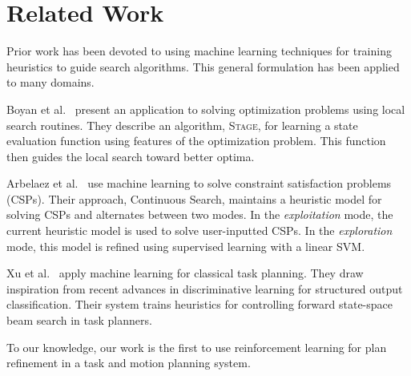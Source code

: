 \section{Related Work}
Prior work has been devoted to using machine learning techniques for
training heuristics to guide search algorithms. This general formulation
has been applied to many domains.

Boyan et al.~\cite{Boyanlearning} present an application to solving optimization
problems using local search routines. They describe an algorithm, \textsc{Stage},
for learning a state evaluation function using features of the optimization problem.
This function then guides the local search toward better optima.

Arbelaez et al.~\cite{hamadisearch} use machine learning to solve constraint
satisfaction problems (CSPs). Their approach, Continuous Search, maintains a heuristic
model for solving CSPs and alternates between two modes. In the \emph{exploitation} mode,
the current heuristic model is used to solve user-inputted CSPs. In the \emph{exploration}
mode, this model is refined using supervised learning with a linear SVM.

Xu et al.~\cite{Xu07discriminativelearning} apply machine learning for classical task
planning. They draw inspiration from recent advances in discriminative learning for
structured output classification. Their system trains heuristics for controlling forward
state-space beam search in task planners.

To our knowledge, our work is the first to use reinforcement learning for plan refinement
in a task and motion planning system.
